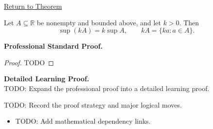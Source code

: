 \newpage
{}
\label{prf:scalar-mult-positive}

\begin{remark*}[Return]
\hyperref[thm:scalar-mult-positive]{Return to Theorem}
\end{remark*}

\begin{theorem*}
Let $A\subseteq\mathbb{R}$ be nonempty and bounded above, and let $k>0$. Then
\[
  \sup(kA)=k\sup A,
  \qquad
  kA=\{ka:a\in A\}.
\]
\end{theorem*}

\textbf{Professional Standard Proof.}~\\
\begin{proof}
TODO
\end{proof}

\textbf{Detailed Learning Proof.}~\\
TODO: Expand the professional proof into a detailed learning proof.

\begin{remark*}
TODO: Record the proof strategy and major logical moves.
\end{remark*}

\begin{dependencies}
\begin{itemize}
  \item TODO: Add mathematical dependency links.
\end{itemize}
\end{dependencies}
